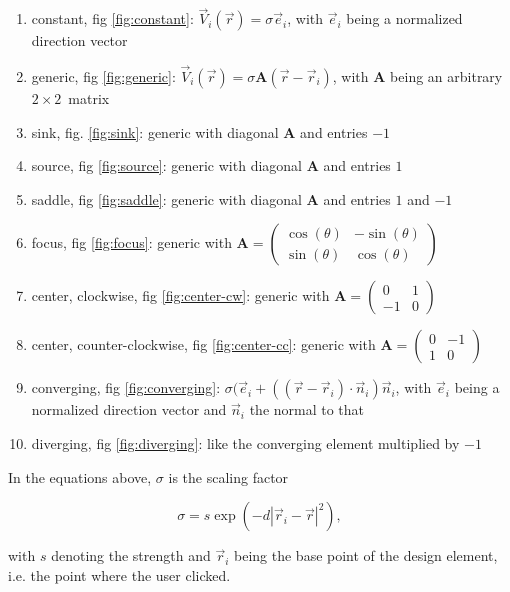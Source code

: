 \documentclass[a4paper,10pt,notitlepage]{scrreprt}
\newcommand{\mat}[1]{\mathbf{#1}}
\begin{document}
\begin{enumerate}
 \item constant, fig \ref{fig:constant}: $\vec{V}_i(\vec{r}) = \sigma
\vec{e}_i$, with $\vec{e}_i$ being a normalized direction vector
 \item generic, fig \ref{fig:generic}: $\vec{V}_i(\vec{r}) = \sigma \mat{A}
(\vec{r} - \vec{r}_i) $, with $\mat{A}$ being an arbitrary $2\times2$~matrix
 \item sink, fig. \ref{fig:sink}: generic with diagonal $\mat{A}$ and entries
$-1$
 \item source, fig \ref{fig:source}: generic with diagonal $\mat{A}$ and
entries $1$
 \item saddle, fig \ref{fig:saddle}: generic with diagonal $\mat{A}$ and
entries $1$ and $-1$
 \item focus, fig \ref{fig:focus}: generic with $\mat{A} = \left(
\begin{array}{cc}
\cos(\theta) & -\sin(\theta) \\
\sin(\theta) & \cos(\theta) \end{array} \right)$
 \item center, clockwise, fig \ref{fig:center-cw}: generic with $\mat{A} =
\left(
\begin{array}{cc}
0 & 1 \\
-1 & 0 \end{array} \right)$
 \item center, counter-clockwise, fig \ref{fig:center-cc}: generic with $\mat{A}
= \left(
\begin{array}{cc}
0 & -1 \\
1 & 0 \end{array} \right)$
 \item converging, fig \ref{fig:converging}: $\sigma (\vec{e}_i + ((\vec{r} -
\vec{r}_i) \cdot \vec{n}_i) \vec{n}_i$, with $\vec{e}_i$ being a normalized
direction vector and $\vec{n}_i$ the normal to that
 \item diverging, fig \ref{fig:diverging}: like the converging element
multiplied by $-1$
\end{enumerate}

In the equations above, $\sigma$ is the scaling factor

\begin{equation}
 \sigma = s \exp(-d |\vec{r}_i - \vec{r}|^2),
\end{equation}

with $s$ denoting the strength and $\vec{r}_i$ being the base point of the
design element, i.e. the point where the user clicked.
\end{document}
